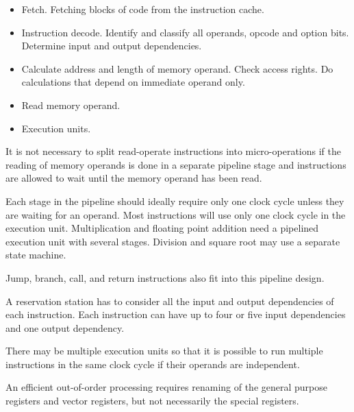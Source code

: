 \documentclass[forwardcom.tex]{subfiles}
\begin{document}
\begin{itemize}
\item  Fetch. Fetching blocks of code from the instruction cache. 

\item  Instruction decode. Identify and classify all operands, opcode and option bits. Determine input and output dependencies.

\item  Calculate address and length of memory operand. Check access rights. Do calculations that depend on immediate operand only.

\item  Read memory operand.

\item  Execution units.  

\end{itemize}
\vspace{2mm}

It is not necessary to split read-operate instructions into micro-operations if the reading of memory operands is done in a separate pipeline stage and instructions are allowed to wait until the memory operand has been read. 
\vspace{2mm}

Each stage in the pipeline should ideally require only one clock cycle unless they are waiting for an operand.  Most instructions will use only one clock cycle in the execution unit. Multiplication and floating point addition need a pipelined execution unit with several stages. Division and square root may use a separate state machine. 
\vspace{2mm}

Jump, branch, call, and return instructions also fit into this pipeline design. 
\vspace{2mm}

A reservation station has to consider all the input and output dependencies of each instruction. Each instruction can have up to four or five input dependencies and one output dependency. 
\vspace{2mm}

There may be multiple execution units so that it is possible to run multiple instructions in the same clock cycle if their operands are independent. 
\vspace{2mm}

An efficient out-of-order processing requires renaming of the general purpose registers and vector registers, but not necessarily the special registers. 
\vspace{2mm}
\end{document}

